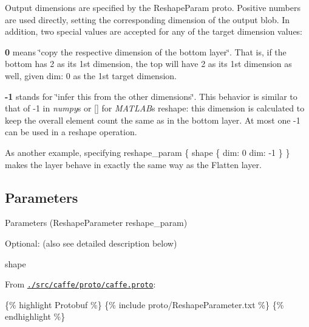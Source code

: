 Output dimensions are specified by the {\ttfamily Reshape\+Param} proto. Positive numbers are used directly, setting the corresponding dimension of the output blob. In addition, two special values are accepted for any of the target dimension values\+:


\begin{DoxyItemize}
\item {\bfseries 0} means \char`\"{}copy the respective dimension of the bottom layer\char`\"{}. That is, if the bottom has 2 as its 1st dimension, the top will have 2 as its 1st dimension as well, given {\ttfamily dim\+: 0} as the 1st target dimension.
\item {\bfseries -\/1} stands for \char`\"{}infer this from the other dimensions\char`\"{}. This behavior is similar to that of -\/1 in {\itshape numpy}\textquotesingle{}s or {\ttfamily \mbox{[}\mbox{]}} for {\itshape M\+A\+T\+L\+AB}\textquotesingle{}s reshape\+: this dimension is calculated to keep the overall element count the same as in the bottom layer. At most one -\/1 can be used in a reshape operation.
\end{DoxyItemize}

As another example, specifying {\ttfamily reshape\+\_\+param \{ shape \{ dim\+: 0 dim\+: -\/1 \} \}} makes the layer behave in exactly the same way as the {\ttfamily Flatten} layer.

\subsection*{Parameters}


\begin{DoxyItemize}
\item Parameters ({\ttfamily Reshape\+Parameter reshape\+\_\+param})
\begin{DoxyItemize}
\item Optional\+: (also see detailed description below)
\begin{DoxyItemize}
\item {\ttfamily shape}
\end{DoxyItemize}
\end{DoxyItemize}
\item From \href{https://github.com/BVLC/caffe/blob/master/src/caffe/proto/caffe.proto}{\tt {\ttfamily ./src/caffe/proto/caffe.proto}}\+:
\end{DoxyItemize}

\{\% highlight Protobuf \%\} \{\% include proto/\+Reshape\+Parameter.\+txt \%\} \{\% endhighlight \%\} 